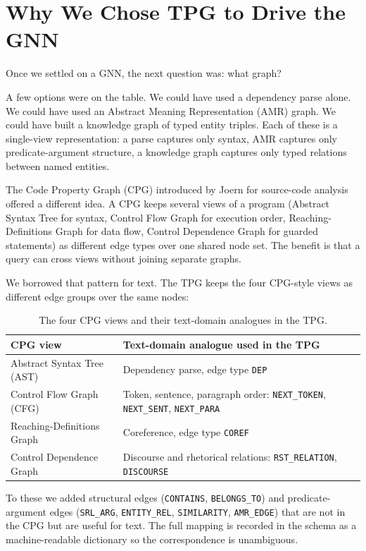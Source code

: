 \documentclass[11pt]{article}
\begin{document}
\section{Why We Chose TPG to Drive the GNN}

Once we settled on a GNN, the next question was: what graph?

A few options were on the table. We could have used a dependency parse
alone. We could have used an Abstract Meaning Representation (AMR)
graph. We could have built a knowledge graph of typed entity triples.
Each of these is a single-view representation: a parse captures only
syntax, AMR captures only predicate-argument structure, a knowledge
graph captures only typed relations between named entities.

The Code Property Graph (CPG) introduced by Joern for source-code
analysis offered a different idea. A CPG keeps several views of a
program (Abstract Syntax Tree for syntax, Control Flow Graph for
execution order, Reaching-Definitions Graph for data flow, Control
Dependence Graph for guarded statements) as different edge types over
one shared node set. The benefit is that a query can cross views
without joining separate graphs.

We borrowed that pattern for text. The TPG keeps the four CPG-style
views as different edge groups over the same nodes:

\begin{table}[h]
\centering
\small
\begin{tabular}{ll}
\toprule
CPG view & Text-domain analogue used in the TPG \\
\midrule
Abstract Syntax Tree (AST) & Dependency parse, edge type \texttt{DEP} \\
Control Flow Graph (CFG)   & Token, sentence, paragraph order: \texttt{NEXT\_TOKEN}, \texttt{NEXT\_SENT}, \texttt{NEXT\_PARA} \\
Reaching-Definitions Graph & Coreference, edge type \texttt{COREF} \\
Control Dependence Graph   & Discourse and rhetorical relations: \texttt{RST\_RELATION}, \texttt{DISCOURSE} \\
\bottomrule
\end{tabular}
\caption{The four CPG views and their text-domain analogues in the TPG.}
\end{table}

To these we added structural edges (\texttt{CONTAINS}, \texttt{BELONGS\_TO})
and predicate-argument edges (\texttt{SRL\_ARG}, \texttt{ENTITY\_REL},
\texttt{SIMILARITY}, \texttt{AMR\_EDGE}) that are not in the CPG but
are useful for text. The full mapping is recorded in the schema as a
machine-readable dictionary so the correspondence is unambiguous.
\end{document}
